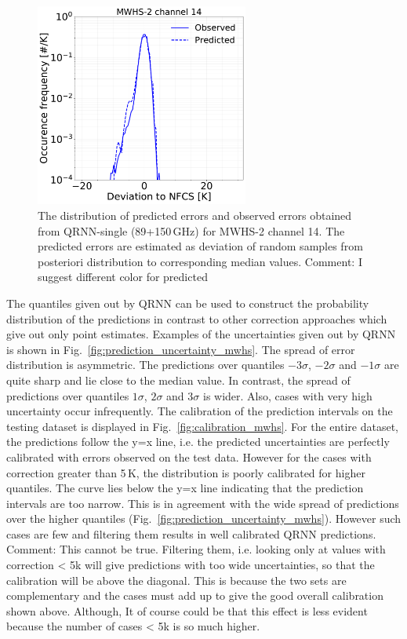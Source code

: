 \documentclass[amt, manuscript]{copernicus}
\newcommand{\todo}[1]{{\color{red} #1}}
\begin{document}
\begin{figure}[t]
	\includegraphics[width=70mm]{Figures/deviation_posterior_mwhs_samples_14.pdf}	
	\caption{The distribution of predicted errors and observed errors  obtained from QRNN-single (89+150\,GHz) for MWHS-2 channel 14. The predicted errors are estimated as deviation of random samples from posteriori distribution to corresponding median values. \todo{Comment: I suggest different color for predicted}}
	\label{fig:predicted_errors_mwhs}	
\end{figure}

The quantiles given out by QRNN can be used to construct the probability
distribution of the predictions in contrast to other correction approaches which
give out only point estimates. Examples of the uncertainties given out by QRNN
is shown in Fig.~\ref{fig:prediction_uncertainty_mwhs}. The spread of error
distribution is asymmetric. The predictions over quantiles $-3\sigma$,
$-2\sigma$ and $-1\sigma$ are quite sharp and lie close to the median value. In
contrast, the spread of predictions over quantiles $1\sigma$, $2\sigma$ and
$3\sigma$ is wider. Also, cases with very high uncertainty occur infrequently.
The calibration of the prediction intervals on the testing dataset is displayed
in Fig.~\ref{fig:calibration_mwhs}. For the entire dataset, the predictions
follow the y=x line, i.e. the predicted uncertainties are perfectly calibrated
with errors observed on the test data. However for the cases with correction
greater than 5\,K, the distribution is poorly calibrated for higher quantiles.
The curve lies below the y=x line indicating that the prediction intervals are
too narrow. This is in agreement with the wide spread of predictions over the
higher quantiles (Fig.~\ref{fig:prediction_uncertainty_mwhs}). However such
cases are few and filtering them results in well calibrated QRNN predictions.
\todo{Comment: This cannot be true. Filtering them, i.e. looking only at values with
  correction < 5k will give predictions with too wide uncertainties, so that the
  calibration will be above the diagonal. This is because the two sets are complementary
  and the cases must add up to give the good overall calibration shown above.
  Although, It of course could be that this effect is less evident because the
  number of cases < 5k is so much higher.}
\end{document}
